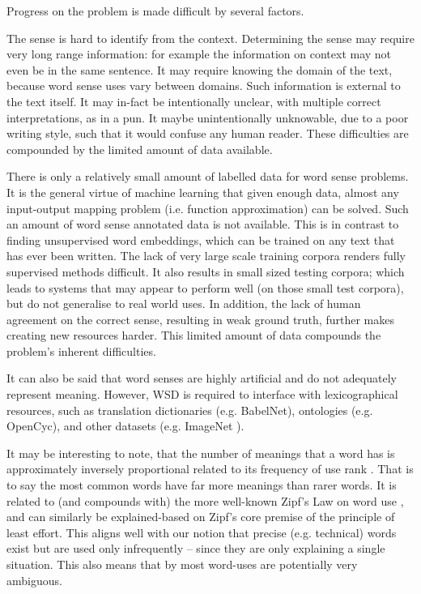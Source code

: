 {Progress on the problem is made difficult by several factors.

The sense is hard to identify from the context.
Determining the sense may require very long range information:
for example the information on context may not even be in the same sentence.
It may require knowing the domain of the text, because word sense uses vary between domains.
Such information is external to the text itself.
It may in-fact be intentionally unclear, with multiple correct interpretations, as in a pun.
It maybe unintentionally unknowable, due to a poor writing style, such that it would confuse any human reader.
These difficulties are compounded by the limited amount of data available.

There is only a relatively small amount of labelled data for word sense problems.
It is the general virtue of machine learning that given enough data, almost any input-output mapping problem (i.e. function approximation) can be solved.
Such an amount of word sense annotated data is not available.
This is in contrast to finding unsupervised word embeddings, which can be trained on any text that has ever been written.
The lack of very large scale training corpora renders fully supervised methods difficult.
It also results in small sized testing corpora; which leads to systems that may appear to perform well (on those small test corpora), but do not generalise to real world uses.
In addition, the lack of human agreement on the correct sense, resulting in weak ground truth, further makes creating new resources harder.
This limited amount of data compounds the problem's inherent difficulties.


It can also be said that word senses are highly artificial and do not adequately represent meaning.
However, WSD is required to interface with  lexicographical resources,
such as translation dictionaries (e.g. BabelNet), ontologies (e.g. OpenCyc), and other datasets (e.g. ImageNet ).


It may be interesting to note, that the number of meanings that a word has is approximately inversely proportional related to its frequency of use rank .
That is to say the most common words have far more meanings than rarer words.
It is related to (and compounds with) the more well-known Zipf's Law on word use , and can similarly be explained-based on Zipf's core premise of the principle of least effort. 
This aligns well with our notion that precise (e.g. technical) words exist but are used only infrequently -- since they are only explaining a single situation.
This also means that by most word-uses are potentially very ambiguous.

}
